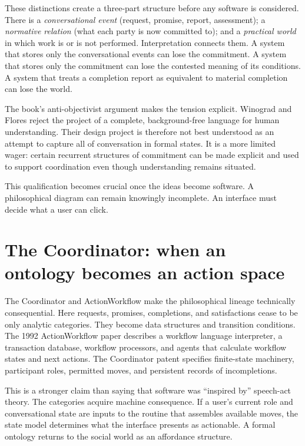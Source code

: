 \documentclass[11pt]{article}
\begin{document}
These distinctions create a three-part structure before any software is considered. There is a \emph{conversational event} (request, promise, report, assessment); a \emph{normative relation} (what each party is now committed to); and a \emph{practical world} in which work is or is not performed. Interpretation connects them. A system that stores only the conversational events can lose the commitment. A system that stores only the commitment can lose the contested meaning of its conditions. A system that treats a completion report as equivalent to material completion can lose the world.

The book's anti-objectivist argument makes the tension explicit. Winograd and Flores reject the project of a complete, background-free language for human understanding. Their design project is therefore not best understood as an attempt to capture all of conversation in formal states. It is a more limited wager: certain recurrent structures of commitment can be made explicit and used to support coordination even though understanding remains situated. \cite{winogradflores1986understanding}

This qualification becomes crucial once the ideas become software. A philosophical diagram can remain knowingly incomplete. An interface must decide what a user can click.

\section{The Coordinator: when an ontology becomes an action space}
The Coordinator and ActionWorkflow make the philosophical lineage technically consequential. Here requests, promises, completions, and satisfactions cease to be only analytic categories. They become data structures and transition conditions. The 1992 ActionWorkflow paper describes a workflow language interpreter, a transaction database, workflow processors, and agents that calculate workflow states and next actions. The Coordinator patent specifies finite-state machinery, participant roles, permitted moves, and persistent records of incompletions. \cite{medinamora1992actionworkflow,flores1993conversation}

This is a stronger claim than saying that software was ``inspired by'' speech-act theory. The categories acquire machine consequence. If a user's current role and conversational state are inputs to the routine that assembles available moves, the state model determines what the interface presents as actionable. A formal ontology returns to the social world as an affordance structure.
\end{document}
